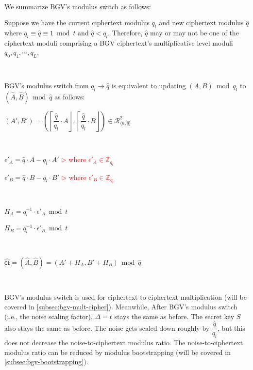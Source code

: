 $ $

We summarize BGV's modulus switch as follows:



\begin{tcolorbox}[title={\textbf{\tboxlabel{\ref*{subsec:bgv-modulus-switch}} BGV's Modulus Switch}}]

Suppose we have the current ciphertext modulus $q_l$ and new ciphertext modulus $\hat{q}$ where $q_l \equiv \hat{q} \equiv 1 \bmod t$ and $\hat{q} < q_l$. Therefore, $\hat{q}$ may or may not be one of the ciphertext moduli comprising a BGV ciphertext's multiplicative level moduli $q_0, q_1, \cdots, q_L$.

$ $

BGV's modulus switch from $q_l \rightarrow \hat{q}$ is equivalent to updating $(A, B) \bmod q_l$ to $(\hat A, \hat B) \bmod \hat{q}$ as follows:


$(A', B') = \left(\left\lceil\dfrac{\hat{q}}{q_l}\cdot A\right\rfloor, \left\lceil\dfrac{\hat{q}}{q_l}\cdot B\right\rfloor\right) \in \mathcal{R}_{\langle n, \hat{q} \rangle}^2$

$ $

$\epsilon'_A = \hat{q}\cdot A - q_l\cdot A'$ \textcolor{red}{ $\rhd$ where $\epsilon'_A \in \mathbb{Z}_{q_l}$}

$\epsilon'_B = \hat{q}\cdot B - q_l\cdot B'$ \textcolor{red}{ $\rhd$ where $\epsilon'_B \in \mathbb{Z}_{q_l}$}


$ $

$H_A = q_l^{-1}\cdot\epsilon'_A \bmod t$

$H_B = q_l^{-1}\cdot\epsilon'_B \bmod t$

$ $

$\hat{\textsf{ct}} = (\hat{A}, \hat{B}) = (A' + H_A, B' + H_B) \bmod \hat{q}$

$ $

BGV's modulus switch is used for ciphertext-to-ciphertext multiplication (will be covered in \autoref{subsec:bgv-mult-cipher}). Meanwhile, After BGV's modulus switch (i.e., the noise scaling factor), $\Delta = t$ stays the same as before. The secret key $S$ also stays the same as before. The noise gets scaled down roughly by $\dfrac{\hat{q}}{q_l}$, but this does not decrease the noise-to-ciphertext modulus ratio. The noise-to-ciphertext modulus ratio can be reduced by modulus bootstrapping (will be covered in \autoref{subsec:bgv-bootstrapping}). 

\end{tcolorbox}



